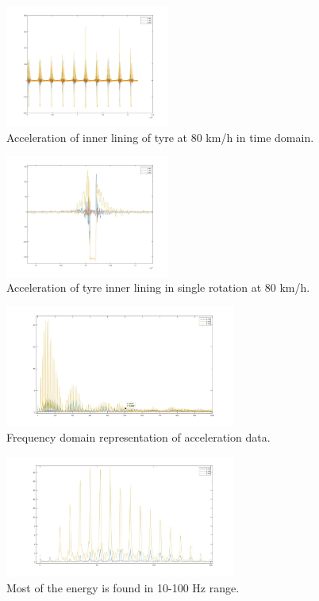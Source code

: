 \begin{figure}[htb]
\begin{center}
\includegraphics[height=4cm]{images/80kmh_timedomain}
\end{center}
\caption{Acceleration of inner lining of tyre at 80 km/h in time domain.}
\label{80_TD}
\end{figure}

\begin{figure}[htb]
\begin{center}
\includegraphics[height=4cm]{images/80kmh_timedomain_onerotation}
\end{center}
\caption{Acceleration of tyre inner lining in single rotation at 80 km/h. }
\label{80_TD_zoom}
\end{figure}

\begin{figure}[htb]
\begin{center}
\includegraphics[height=4cm]{images/FFT-80}
\end{center}
\caption{Frequency domain representation of acceleration data.}
\label{80_FFT}
\end{figure}

\begin{figure}[htb]
\begin{center}
\includegraphics[height=4cm]{images/FFT-80-zoom}
\end{center}
\caption{Most of the energy is found in 10-100 Hz range.}
\label{80_FFT_zoom}
\end{figure}

